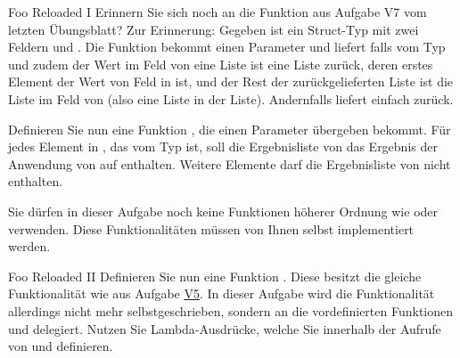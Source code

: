 \documentclass{../tuda-exercise}
\begin{document}
  \clearpagesolution

  \begin{task}[credit=\stars{2}{3}]{Foo Reloaded I}
    \label{task:V5}
    Erinnern Sie sich noch an die Funktion  aus Aufgabe V7 vom letzten
    Übungsblatt? Zur Erinnerung: Gegeben ist ein Struct-Typ  mit zwei Feldern
     und . Die Funktion  bekommt einen
    Parameter  und liefert falls  vom Typ  und
    zudem der Wert im Feld  von  eine Liste ist eine Liste
    zurück, deren erstes Element der Wert von Feld  in  ist, und
    der Rest der zurückgelieferten Liste ist die Liste im Feld  von
     (also eine Liste in der Liste). Andernfalls liefert 
    einfach  zurück.

    \br

    Definieren Sie nun eine Funktion , die einen Parameter 
    übergeben bekommt. Für jedes Element  in , das vom Typ
     ist, soll die Ergebnisliste von  das Ergebnis der
    Anwendung von  auf  enthalten. Weitere Elemente darf die
    Ergebnisliste von  nicht enthalten.

    \br

    \begin{note}[title=Verbindliche Anforderung:, color=tuda-orange]
      Sie dürfen in dieser Aufgabe noch keine Funktionen höherer Ordnung wie  oder
       verwenden. Diese Funktionalitäten müssen von Ihnen selbst
      implementiert werden.
    \end{note}

    \begin{solution}
      
    \end{solution}
  \end{task}

  \begin{task}[credit=\stars{2}{3}]{Foo Reloaded II}
    Definieren Sie nun eine Funktion . Diese besitzt die gleiche
    Funktionalität wie  aus Aufgabe \hyperref[task:V5]{V5}. In dieser Aufgabe
    wird die Funktionalität allerdings nicht mehr selbstgeschrieben, sondern an die
    vordefinierten Funktionen  und  delegiert. Nutzen Sie
    Lambda-Ausdrücke, welche Sie innerhalb der Aufrufe von  und
     definieren.

    \begin{solution}
      
    \end{solution}
  \end{task}
\end{document}
